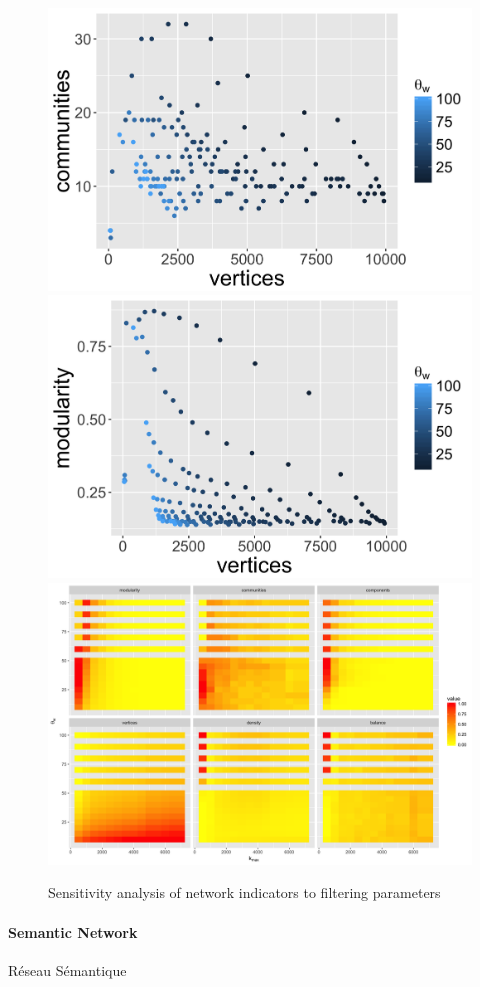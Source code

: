 \begin{figure}
\includegraphics[width=0.49\linewidth]{Figures/Quantepistemo/pareto-com-vertices}
\includegraphics[width=0.49\linewidth]{Figures/Quantepistemo/pareto-modularity-vertices}\\
\includegraphics[width=\linewidth]{Figures/Quantepistemo/sensitivity_freqmin0_normalized}
\caption{Sensitivity analysis of network indicators to filtering parameters}{}
\label{fig:app:quantepistemo:sensitivity}
\end{figure}



\paragraph{Semantic Network}{Réseau Sémantique}

